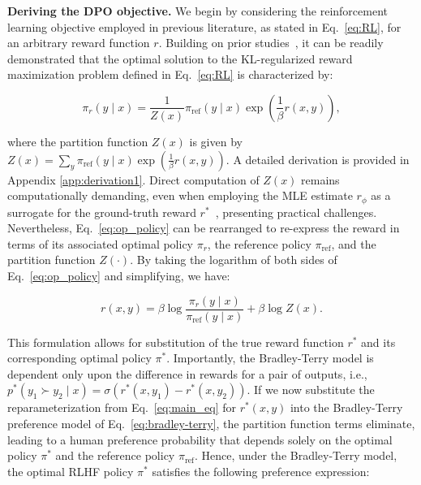 \textbf{Deriving the DPO objective.} We begin by considering the reinforcement learning objective employed in previous literature, as stated in Eq.~\ref{eq:RL}, for an arbitrary reward function $r$. Building on prior studies~\citep{peters2007reinforcement, peng2019advantage, korbak2022reinforcement, go2023aligning}, it can be readily demonstrated that the optimal solution to the KL-regularized reward maximization problem defined in Eq.~\ref{eq:RL} is characterized by:

\begin{equation}\label{eq:op_policy}
    \pi_r(y\mid x) = \frac{1}{Z(x)}\pi_\text{ref}(y\mid x)\exp\left(\frac{1}{\beta}r(x, y)\right),
\end{equation}

where the partition function $Z(x)$ is given by $Z(x) =\sum_{y}\pi_\text{ref}(y\mid x)\exp\left(\frac{1}{\beta}r(x, y)\right)$. A detailed derivation is provided in Appendix \ref{app:derivation1}. Direct computation of $Z(x)$ remains computationally demanding, even when employing the MLE estimate $r_{\phi}$ as a surrogate for the ground-truth reward $r^*$~\citep{korbak2022reinforcement, go2023aligning}, presenting practical challenges. Nevertheless, Eq.~\ref{eq:op_policy} can be rearranged to re-express the reward in terms of its associated optimal policy $\pi_r$, the reference policy $\pi_\text{ref}$, and the partition function $Z(\cdot)$. By taking the logarithm of both sides of Eq.~\ref{eq:op_policy} and simplifying, we have:

\begin{equation}\label{eq:main_eq}
    r(x,y) =\beta \log \frac{\pi_r(y\mid x)}{\pi_\text{ref}(y\mid x)} + \beta \log Z(x).
\end{equation}

This formulation allows for substitution of the true reward function $r^*$ and its corresponding optimal policy $\pi^*$. Importantly, the Bradley-Terry model is dependent only upon the difference in rewards for a pair of outputs, i.e., ${p^*(y_1 \succ y_2 \mid x) = \sigma(r^*(x, y_1) - r^*(x, y_2))}$. If we now substitute the reparameterization from Eq.~\ref{eq:main_eq} for $r^*(x,y)$ into the Bradley-Terry preference model of Eq.~\ref{eq:bradley-terry}, the partition function terms eliminate, leading to a human preference probability that depends solely on the optimal policy $\pi^*$ and the reference policy $\pi_\text{ref}$. Hence, under the Bradley-Terry model, the optimal RLHF policy $\pi^*$ satisfies the following preference expression:

